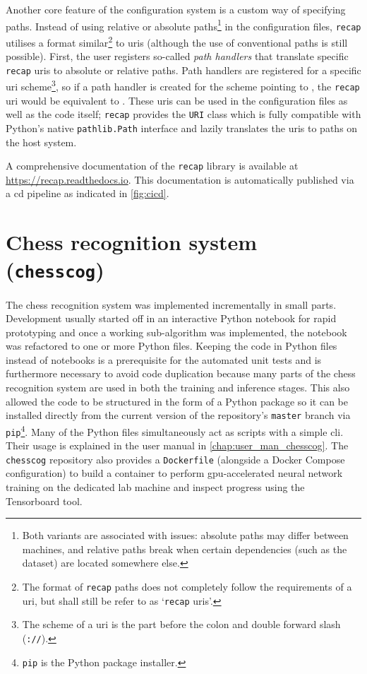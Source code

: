 \documentclass[../report.tex]{subfiles}
\begin{document}
Another core feature of the configuration system is a custom way of specifying paths.
Instead of using relative or absolute paths\footnote{Both variants are associated with issues: absolute paths may differ between machines, and relative paths break when certain dependencies (such as the dataset) are located somewhere else.} in the configuration files, \texttt{recap} utilises a format similar\footnote{The format of \texttt{recap} paths does not completely follow the requirements of a \gls{uri}, but shall still be refer to as `\texttt{recap} \glspl{uri}'.} to \glspl{uri} (although the use of conventional paths is still possible).
First, the user registers so-called \emph{path handlers} that translate specific \texttt{recap} \glspl{uri} to absolute or relative paths.
Path handlers are registered for a specific \gls{uri} scheme\footnote{The scheme of a \gls{uri} is the part before the colon and double forward slash (\texttt{://}).}, so if a path handler is created for the  scheme pointing to , the \texttt{recap} \gls{uri}  would be equivalent to .
These \glspl{uri} can be used in the configuration files as well as the code itself; 
\texttt{recap} provides the \texttt{URI} class which is fully compatible with Python's native \texttt{pathlib.Path} interface and lazily translates the \glspl{uri} to paths on the host system.

A comprehensive documentation of the \texttt{recap} library is available at \url{https://recap.readthedocs.io}.
This documentation is automatically published via a \gls{cd} pipeline as indicated in \cref{fig:cicd}.

\section{Chess recognition system (\texttt{chesscog})}
The chess recognition system was implemented incrementally in small parts. 
Development usually started off in an interactive Python notebook for rapid prototyping and once a working sub-algorithm was implemented, the notebook was refactored to one or more Python files.
Keeping the code in Python files instead of notebooks is a prerequisite for the automated unit tests and is furthermore necessary to avoid code duplication because many parts of the chess recognition system are used in both the training and inference stages.
This also allowed the code to be structured in the form of a Python package so it can be installed directly from the current version of the repository's \texttt{master} branch via \texttt{pip}\footnote{\texttt{pip} is the Python package installer.}.
Many of the Python files simultaneously act as scripts with a simple \gls{cli}.
Their usage is explained in the user manual in \cref{chap:user_man_chesscog}.
The \texttt{chesscog} repository also provides a \texttt{Dockerfile} (alongside a Docker Compose configuration) to build a container to perform \gls{gpu}-accelerated neural network training on the dedicated lab machine and inspect progress using the Tensorboard tool.
\end{document}
